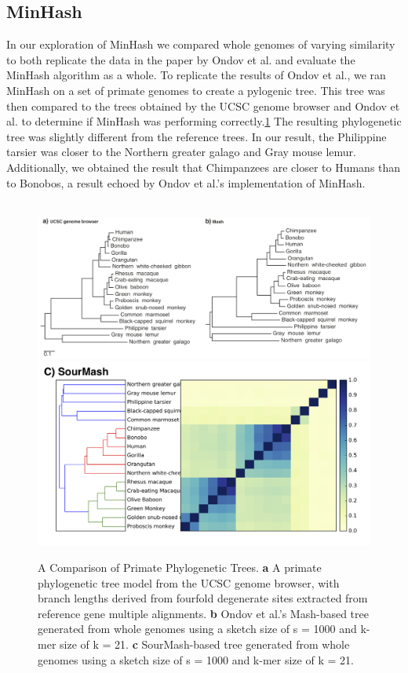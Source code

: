 \documentclass[12pt, letterpaper]{article}
\begin{document}
\subsection{MinHash}
In our exploration of MinHash we compared whole genomes of varying similarity to both replicate the data in the paper by Ondov et al. and evaluate the MinHash algorithm as a whole. To replicate the results of Ondov et al., we ran MinHash on a set of primate genomes to create a pylogenic tree. This tree was then compared to the trees obtained by the UCSC genome browser and Ondov et al. to determine if MinHash was performing correctly.\ref{fig:Primate Tree} The resulting phylogenetic tree was slightly different from the reference trees. In our result, the Philippine tarsier was closer to the Northern greater galago and Gray mouse lemur. Additionally, we obtained the result that Chimpanzees are closer to Humans than to Bonobos, a result echoed by Ondov et al.'s implementation of MinHash. \\ \\
\begin{figure}[h]
    \centering
    \includegraphics[width=1.0\textwidth]{Figure4_Ondov}
    \includegraphics[width=1.0\textwidth]{Apes_Matrix_Common}
    \caption{A Comparison of Primate Phylogenetic Trees. \textbf{a} A primate phylogenetic tree model from the UCSC genome browser, with branch lengths derived from fourfold degenerate sites extracted from reference gene multiple alignments. \textbf{b} Ondov et al.'s Mash-based tree generated from whole genomes using a sketch size of s = 1000 and k-mer size of k = 21.\cite{MinHash} \textbf{c} SourMash-based tree generated from whole genomes using a sketch size of s = 1000 and k-mer size of k = 21.}
    \label{fig:Primate Tree}
\end{figure}
\end{document}
